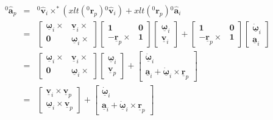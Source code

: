 \documentclass[a4paper]{article}
\newcommand{\Spa}[1]{\mathbf{\hat{#1}}}
\newcommand{\Nspa}[1]{\mathbf{\underline{#1}}}
\newcommand{\Vec}[1]{\mathbf{#1}}
\begin{document}
\begin{eqnarray}
	{}^0\Spa{a}_p & = &{}^0\Spa{v}_i \times^ * \left( xlt\left({}^0\Vec{r}_p\right)
	{}^0\Spa{v}_i \right) + xlt({}^0\Vec{r}_p) {}^0\Spa{a}_i \\
	& = & \left[
	\begin{array}{cc}
		\Nspa{\omega}_i \times & \Nspa{v}_i \times \\
		\Vec{0} & \Nspa{\omega}_i \times
	\end{array}
	\right]
	\left[
	\begin{array}{cc}
		\Vec{1} & \Vec{0} \\
		-\Nspa{r}_p \times & \Vec{1}
	\end{array}
	\right]
	\left[
	\begin{array}{c}
		\Nspa{\omega}_i \\
		\Nspa{v}_i
	\end{array}
	\right]
	+
	\left[
	\begin{array}{cc}
		\Vec{1} & \Vec{0} \\
		- \Nspa{r}_p \times & \Vec{1}
	\end{array}
	\right]
	\left[
	\begin{array}{c}
		\Nspa{\dot{\omega}}_i \\
		\Nspa{a}_i
	\end{array}
	\right]
	\\
	& = & \left[
	\begin{array}{cc}
		\Nspa{\omega}_i \times & \Nspa{v}_i \times \\
		\Vec{0} & \Nspa{\omega}_i \times
	\end{array}
	\right]
	\left[
	\begin{array}{c}
		\Nspa{\omega}_i \\
		\Nspa{v}_p
	\end{array}
	\right]
	+
	\left[
	\begin{array}{c}
		\Nspa{\dot{\omega}}_i \\
		\Nspa{a}_i + \Nspa{\dot{\omega}}_i \times \Nspa{r}_p
	\end{array}
	\right]
	\\
	& = & \left[
	\begin{array}{c}
		\Nspa{v}_i \times \Nspa{v}_p \\
		\Nspa{\omega}_i \times \Nspa{v}_p
	\end{array}
	\right]
	+
	\left[
	\begin{array}{c}
		\Nspa{\dot{\omega}}_i \\
		\Nspa{a}_i + \Nspa{\dot{\omega}}_i \times \Nspa{r}_p
	\end{array}
	\right]
\end{eqnarray}
\end{document}

